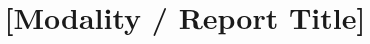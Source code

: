 \documentclass[twoside,final]{hcmut-report}
\title{[Modality / Report Title]}
\begin{document}
\coverpage%


\tableofcontents
\listoffigures
\listoftables

\clearpage






\clearpage


\end{document}
